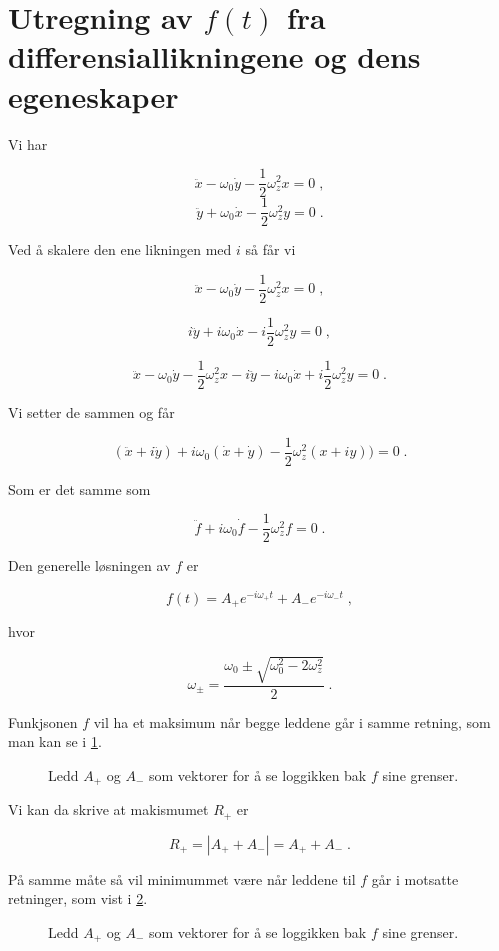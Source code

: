 \documentclass[reprint,english,notitlepage, nofootinbib]{revtex4-1}  %
\begin{document}
\section{Utregning av $f(t)$ fra differensiallikningene og dens egeneskaper}\label{utfxy}

Vi har 

$$
\ddot{x} - \omega_0 \dot{y} - \frac{1}{2}\omega_z^2 x = 0 \; ,
$$
$$\ddot{y} + \omega_0 \dot{x} - \frac{1}{2}\omega_z^2 y = 0 \; .
$$

Ved å skalere den ene likningen med $i$ så får vi

$$\ddot{x} - \omega_0 \dot{y} - \frac{1}{2}\omega_z^2 x = 0 \; ,$$

$$i\ddot{y} + i\omega_0 \dot{x} - i\frac{1}{2}\omega_z^2 y = 0 \; ,$$

$$ \ddot{x} - \omega_0 \dot{y} - \frac{1}{2}\omega_z^2 x -i\ddot{y} - i\omega_0 \dot{x} + i\frac{1}{2}\omega_z^2 y = 0 \; .$$

Vi setter de sammen og får


$$(\ddot{x} + i\ddot{y}) + i\omega_0(\dot{x} + \dot{y}) - \frac{1}{2}\omega_z^2(x+iy) ) = 0 \; .$$
  
Som er det samme som

$$\ddot{f} + i\omega_0 \dot{f} - \frac{1}{2}\omega_z^2f = 0 \; .$$

Den generelle løsningen av $f$ er

$$f(t) =A_+e^{-i\omega_+ t} + A_-e^{-i\omega_- t} \; ,$$

hvor

$$\omega_{\pm} = \frac{\omega_0 \pm \sqrt{\omega_0^2 - 2\omega_z^2}}{2} \; .$$

Funkjsonen $f$ vil ha et maksimum når begge leddene går i samme retning, som man kan se i \ref{tikzsame}. 

\begin{figure}
\scalebox{0.7}{}
\caption{Ledd $A_+$ og $A_-$ som vektorer for å se loggikken bak $f$ sine grenser.}
\label{tikzsame}
\end{figure}

Vi kan da skrive at makismumet $R_+$ er

$$R_+ = |A_+ + A_-| = A_+ + A_- \; .$$

På samme måte så vil minimummet være når leddene til $f$ går i motsatte retninger, som vist i \ref{tikzops}. 

\begin{figure}
\centering
\scalebox{0.7}{}
\caption{Ledd $A_+$ og $A_-$ som vektorer for å se loggikken bak $f$ sine grenser.}
\label{tikzops}
\end{figure}
\end{document}

